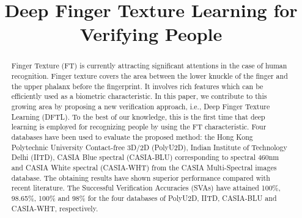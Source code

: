 \documentclass[conference]{IEEEtran}
\begin{document}
\title{Deep Finger Texture Learning for Verifying People\\
}

\author{
\and
{}
\and
{}
}

\maketitle

\begin{abstract}
Finger Texture (FT) is currently attracting significant attentions in the case of human recognition. Finger texture covers the area between the lower knuckle of the finger and the upper phalanx before the fingerprint. It involves rich features  which can be efficiently used as a biometric characteristic. In this paper, we contribute to this growing area by proposing a new verification approach, i.e., Deep Finger Texture Learning (DFTL). To the best of our knowledge, this is the first time that deep learning is employed for recognizing people by using the FT characteristic. Four databases have been used to evaluate the proposed method: the Hong Kong Polytechnic University Contact-free 3D/2D (PolyU2D), Indian Institute of Technology Delhi (IITD), CASIA Blue spectral (CASIA-BLU) corresponding to spectral 460nm and CASIA White spectral (CASIA-WHT) from the CASIA Multi-Spectral images database. The obtaining results have shown superior performance compared with recent literature. The Successful Verification Accuracies (SVAs) have attained 100\%, 98.65\%, 100\% and 98\% for the four databases of PolyU2D, IITD, CASIA-BLU and CASIA-WHT, respectively. 
\end{abstract}
\end{document}
